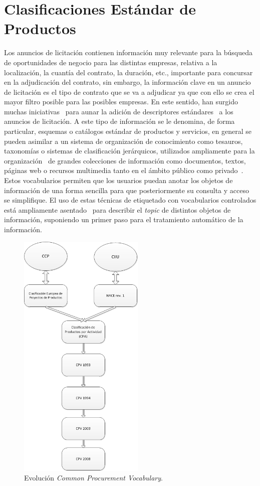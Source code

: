 \clearpage
\section{Clasificaciones Estándar de Productos}\label{sect:pscs}
Los anuncios de licitación contienen información muy relevante para la búsqueda
de oportunidades de negocio para las distintas empresas, relativa a la localización,
la cuantía del contrato, la duración, etc., importante para concursar
en la adjudicación del contrato, sin embargo, la información clave en un anuncio
de licitación es el tipo de contrato que se va a adjudicar ya que con ello
se crea el mayor filtro posible para las posibles empresas. En este sentido,
han surgido muchas iniciativas~\cite{Leukel-findings} para aunar la adición de descriptores estándares~\cite{Leukel-standard}
a los anuncios de licitación. A este tipo de información se le denomina, de forma particular, esquemas o catálogos estándar de productos y 
servicios, en general se pueden asimilar a un sistema de organización de conocimiento como tesauros, taxonomías o sistemas de clasificación jerárquicos, utilizados
ampliamente para la organización~\cite{Leukel-automating} de grandes colecciones de información como 
documentos, textos, páginas web o recursos multimedia tanto en el ámbito público como privado~\cite{Leukel-comparative}. Estos vocabularios
permiten que los usuarios puedan anotar los objetos de información de una forma
sencilla para que posteriormente su consulta y acceso se simplifique. El uso
de estas técnicas de etiquetado con vocabularios controlados está ampliamente
asentado~\cite{Leukel-ecatalog2005} para describir el \textit{topic} de distintos objetos de información, 
suponiendo un primer paso para el tratamiento automático de la información.

\begin{figure}[!htb]
\centering
	\includegraphics[width=6cm]{images/phd/eproc/evo-cpv}
\caption{Evolución \textit{Common Procurement Vocabulary}.}
\label{fig:evo-cpv}
\end{figure}

